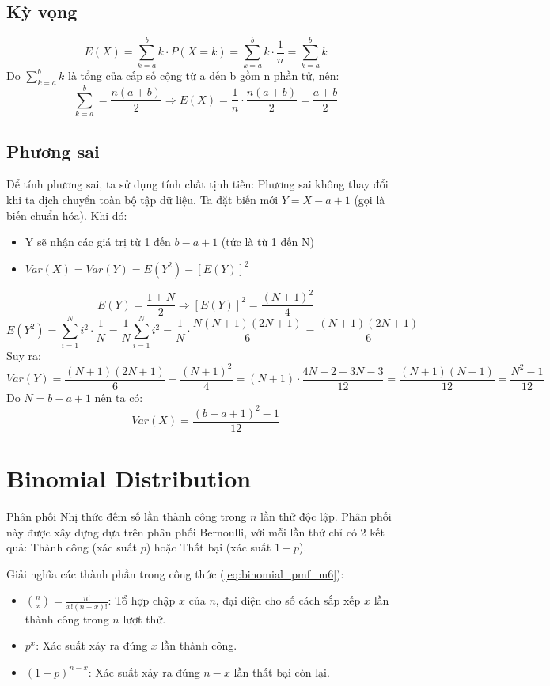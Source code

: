 \subsection*{Kỳ vọng}
\[
E(X)=\sum_{k=a}^{b}k\cdot P(X=k)=\sum_{k=a}^{b}k\cdot \frac{1}{n}=\sum_{k=a}^{b}k
\]
Do $\sum_{k=a}^{b}k$ là tổng của cấp số cộng từ a đến b gồm n phần tử, nên:
\[
\sum_{k=a}^{b}=\frac{n(a+b)}{2} \Rightarrow E(X)=\frac{1}{n}\cdot\frac{n(a+b)}{2}=\frac{a+b}{2}
\]

\subsection*{Phương sai}
Để tính phương sai, ta sử dụng tính chất tịnh tiến: Phương sai không thay đổi khi ta dịch chuyển toàn bộ tập dữ liệu.
Ta đặt biến mới $Y = X - a + 1$ (gọi là biến chuẩn hóa). Khi đó:
\begin{itemize}
	\item Y sẽ nhận các giá trị từ 1 đến $b - a + 1$ (tức là từ 1 đến N)
	\item $Var(X) = Var(Y)=E(Y^2)-[E(Y)]^2$
\end{itemize}
\[
E(Y)=\frac{1+N}{2} \Rightarrow [E(Y)]^2=\frac{(N+1)^2}{4}
\]
\[
E(Y^2)=\sum_{i=1}^{N}i^2\cdot \frac{1}{N}=\frac{1}{N}\sum_{i=1}^{N}i^2 = \frac{1}{N}\cdot\frac{N(N+1)(2N+1)}{6}=\frac{(N+1)(2N+1)}{6}
\]
Suy ra:
\[
Var(Y)=\frac{(N+1)(2N+1)}{6}-\frac{(N+1)^2}{4}=(N+1)\cdot\frac{4N+2-3N-3}{12}=\frac{(N+1)(N-1)}{12}=\frac{N^2-1}{12}
\]
Do $N =  b-a+1$ nên ta có:
\[
Var(X) = \frac{(b-a+1)^2-1}{12}
\]

\section{Binomial Distribution}
\label{sec:Proof_Binomial}

Phân phối Nhị thức đếm số lần thành công trong $n$ lần thử độc lập. 
Phân phối này được xây dựng dựa trên phân phối Bernoulli, với mỗi lần thử chỉ có 2 kết quả: Thành công (xác suất $p$) hoặc Thất bại (xác suất $1-p$).

Giải nghĩa các thành phần trong công thức (\ref{eq:binomial_pmf_m6}):
\begin{itemize}
	\item $\binom{n}{x} = \frac{n!}{x!(n-x)!}$: Tổ hợp chập $x$ của $n$, đại diện cho số cách sắp xếp $x$ lần thành công trong $n$ lượt thử.
	\item $p^x$: Xác suất xảy ra đúng $x$ lần thành công.
	\item $(1-p)^{n-x}$: Xác suất xảy ra đúng $n-x$ lần thất bại còn lại.
\end{itemize}

